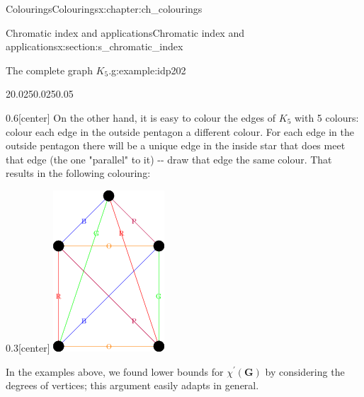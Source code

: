 \documentclass[oneside,10pt,]{book}
\numberwithin{equation}{section}
\newcommand{\bfG}{\mathbf{G}}
\begin{document}
\begin{chapterptx}{Colourings}{}{Colourings}{}{}{x:chapter:ch_colourings}
\begin{sectionptx}{Chromatic index and applications}{}{Chromatic index and applications}{}{}{x:section:s_chromatic_index}
\begin{example}{The complete graph \(K_5\).}{g:example:idp202}
\begin{sidebyside}{2}{0.025}{0.025}{0.05}%
\begin{sbspanel}{0.6}[center]%
On the other hand, it is easy to colour the edges of \(K_5\) with 5 colours:  colour each edge in the outside pentagon a different colour.  For each edge in the outside pentagon there will be a unique edge in the inside star that does meet that edge (the one "parallel" to it) -{}-{} draw that edge the same colour.  That results in the following colouring:%
\end{sbspanel}%
\begin{sbspanel}{0.3}[center]%
\includegraphics[width=\linewidth]{images/K5EdgeColouring3.png}
\end{sbspanel}%
\end{sidebyside}%
\end{example}
In the examples above, we found lower bounds for \(\chi^\prime(\bfG)\) by considering the degrees of vertices; this argument easily adapts in general.%

\end{sectionptx}
\end{chapterptx}
\end{document}
